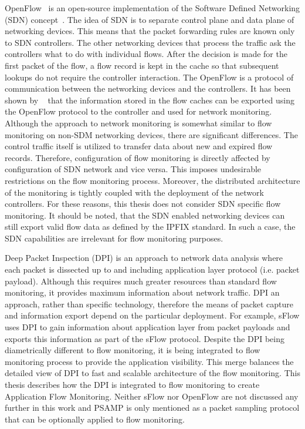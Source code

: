 OpenFlow~\cite{ONF-2012-OpenFlow} is an open-source implementation of the Software Defined Networking (SDN) concept~\cite{Singh-2017-Survey, Hu-2014-Survey}. The idea of SDN is to separate control plane and data plane of networking devices. This means that the packet forwarding rules are known only to SDN controllers. The other networking devices that process the traffic ask the controllers what to do with individual flows. After the decision is made for the first packet of the flow, a flow record is kept in the cache so that subsequent lookups do not require the controller interaction. The OpenFlow is a protocol of communication between the networking devices and the controllers. It has been shown by \citeauthor{Yu-2013-FlowSense}~\cite{Yu-2013-FlowSense} that the information stored in the flow caches can be exported using the OpenFlow protocol to the controller and used for network monitoring. Although the approach to network monitoring is somewhat similar to flow monitoring on non-SDM networking devices, there are significant differences. The control traffic itself is utilized to transfer data about new and expired flow records. Therefore, configuration of flow monitoring is directly affected by configuration of SDN network and vice versa. This imposes undesirable restrictions on the flow monitoring process. Moreover, the distributed architecture of the monitoring is tightly coupled with the deployment of the network controllers. For these reasons, this thesis does not consider SDN specific flow monitoring. It should be noted, that the SDN enabled networking devices can still export valid flow data as defined by the IPFIX standard. In such a case, the SDN capabilities are irrelevant for flow monitoring purposes.

Deep Packet Inspection (DPI) is an approach to network data analysis where each packet is dissected up to and including application layer protocol (i.e. packet payload). Although this requires much greater resources than standard flow monitoring, it provides maximum information about network traffic. DPI an approach, rather than specific technology, therefore the means of packet capture and information export depend on the particular deployment. For example, sFlow uses DPI to gain information about application layer from packet payloads and exports this information as part of the sFlow protocol. Despite the DPI being diametrically different to flow monitoring, it is being integrated to flow monitoring process to provide the application visibility. This merge balances the detailed view of DPI to fast and scalable architecture of the flow monitoring. This thesis describes how the DPI is integrated to flow monitoring to create Application Flow Monitoring. Neither sFlow nor OpenFlow are not discussed any further in this work and PSAMP is only mentioned as a packet sampling protocol that can be optionally applied to flow monitoring.


